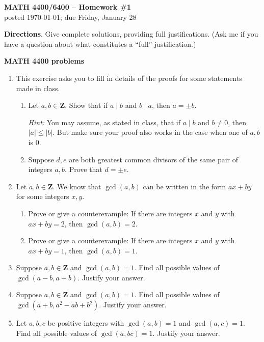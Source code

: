 \documentclass[12pt]{article}
\def\Z{\mathbf{Z}}
\begin{document}
\thispagestyle{empty} \begin{center} {\textbf{MATH 4400/6400 --
Homework \#1}\\ posted \today; due Friday, January 28}
\end{center}

\noindent\textbf{Directions}. Give complete solutions, providing full justifications. (Ask me if you have a question about what constitutes a ``full'' justification.)

\vskip 10pt \noindent\textbf{MATH 4400 problems}
\begin{enumerate}

\item This exercise asks you to fill in details of the proofs for some statements made in class.
\begin{enumerate}
\item Let $a, b \in \Z$. Show that if $a\mid b$ and $b\mid a$, then $a=\pm b$.

{\scriptsize \emph{Hint:} You may assume, as stated in class, that if $a\mid b$ and $b\ne 0$, then $|a| \le |b|$. But make sure your proof also works in the case when one of $a, b$ is $0$.}
\item Suppose $d, e$ are both greatest common divisors of the same pair of integers $a, b$. Prove that $d=\pm e$.
\end{enumerate}

\item Let $a, b \in \Z$. We know that $\gcd(a,b)$ can be written in the form $ax+by$ for some integers $x,y$.
\begin{enumerate}
\item Prove or give a counterexample: If there are integers $x$ and $y$ with $ax+by=2$, then $\gcd(a,b)=2$.
\item Prove or give a counterexample: If there are integers $x$ and $y$ with $ax+by=1$, then $\gcd(a,b)=1$.
\end{enumerate}

\item Suppose $a, b \in \Z$ and $\gcd(a,b)=1$. Find all possible values of $\gcd(a-b,a+b)$. Justify your answer.

\item Suppose $a, b \in \Z$ and $\gcd(a,b)=1$. Find all possible values of $\gcd(a+b,a^2-ab+b^2)$. Justify your answer.

\item Let $a, b, c$ be positive integers with $\gcd(a,b)=1$ and $\gcd(a,c)=1$. Find all possible values of $\gcd(a,bc)=1$. Justify your answer.

\end{enumerate}
\end{document}

